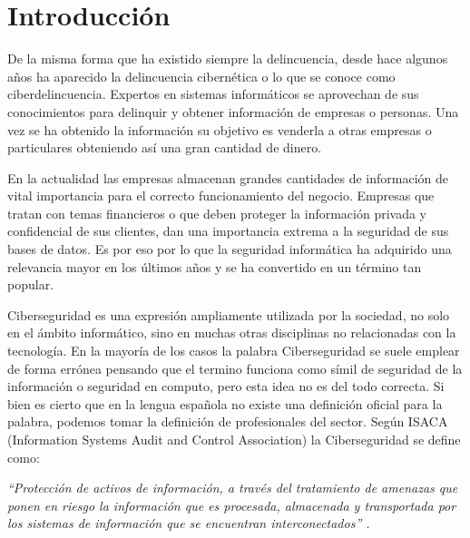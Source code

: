 
\hypersetup{linkcolor=blue}

                        
\chapter{Introducción}
\label{cha:introduccion}

De la misma forma que ha existido siempre la delincuencia, desde hace algunos años ha aparecido 
la delincuencia cibernética o lo que se conoce como ciberdelincuencia. Expertos en sistemas 
informáticos se aprovechan de sus conocimientos para delinquir y obtener información de empresas 
o personas. Una vez se ha obtenido la información su objetivo es venderla a otras empresas o 
particulares obteniendo así una gran cantidad de dinero. 

En la actualidad las empresas almacenan grandes cantidades de información de vital importancia
para el correcto funcionamiento del negocio. Empresas que tratan con temas financieros 
o que deben proteger la información privada y confidencial de sus clientes, dan una importancia 
extrema a la seguridad de sus bases de datos. Es por eso por lo que la seguridad informática 
ha adquirido una relevancia mayor en los últimos años y se ha convertido en un término tan 
popular.

Ciberseguridad es una expresión ampliamente utilizada por la sociedad, no solo en el ámbito 
informático, sino en muchas otras disciplinas no relacionadas con la tecnología. En la mayoría 
de los casos la palabra Ciberseguridad se suele emplear de forma errónea pensando que el 
termino funciona como símil de seguridad de la información o seguridad en computo, pero esta
idea no es del todo correcta. Si bien es cierto que en la lengua española no existe una definición 
oficial para la palabra, podemos tomar la definición de profesionales del sector. 
Según ISACA (Information Systems Audit and Control Association) la Ciberseguridad se define como:

\emph{“Protección de activos de información, a través del tratamiento de amenazas que ponen en riesgo la información 
que es procesada, almacenada y transportada por los sistemas de información que se encuentran interconectados” \cite{bsecure}.}

